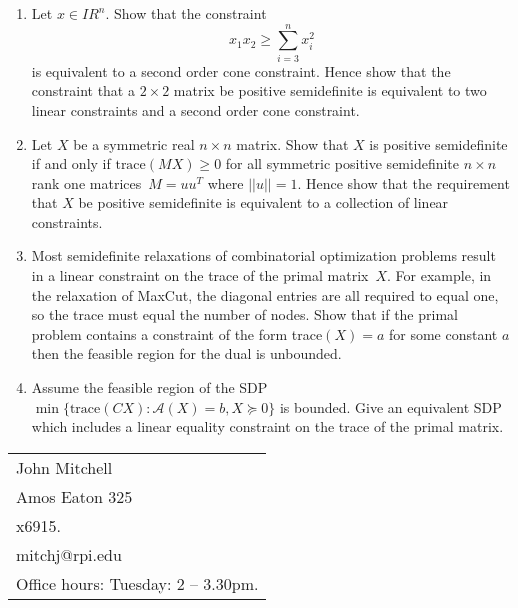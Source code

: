 \documentclass[12pt]{article}
\newcommand{\re}{I \!\! R}
\begin{document}
\begin{enumerate}
 \item
   Let $x \in \re^n$. Show that the constraint
   \begin{displaymath}
   x_1 x_2 \geq \sum_{i=3}^n x_i^2
   \end{displaymath}
   is equivalent to a second order cone constraint.
   Hence show that the constraint that a $2\times 2$ matrix be positive semidefinite
   is equivalent to two linear constraints and a second order cone constraint.
  \item
    Let $X$ be a symmetric real $n \times n$ matrix.
    Show that $X$ is positive semidefinite if and only if
    $\mbox{trace}(MX) \geq 0$ for all symmetric positive semidefinite
    $n \times n$ rank one matrices~$M=uu^T$ where $||u||=1$.
    Hence show that the requirement that $X$ be positive semidefinite is
    equivalent to a collection of linear constraints.
  \item
    Most semidefinite relaxations of combinatorial optimization problems
    result in a linear constraint on the trace of the primal matrix~$X$.
    For example, in the relaxation of MaxCut, the diagonal entries are
    all required to equal one, so the trace must equal the number of nodes.
    Show that if the primal problem contains a constraint of the form
    trace$(X)=a$ for some constant $a$ then the feasible region
    for the dual is unbounded.
 \item
    Assume the feasible region of the SDP $\min\{\mbox{trace}(CX): \mathcal{A}(X)=b, X \succeq 0\}$
    is bounded.
    Give an equivalent SDP which includes a linear equality constraint on the 
    trace of the primal matrix.
\end{enumerate}


\vfill

\begin{tabular}{@{\hspace{.5in}}l}
   John Mitchell  \\
   Amos Eaton 325  \\
   x6915.  \\
   mitchj@rpi.edu  \\
   Office hours: Tuesday: 2 -- 3.30pm.
\end{tabular}
\end{document}
